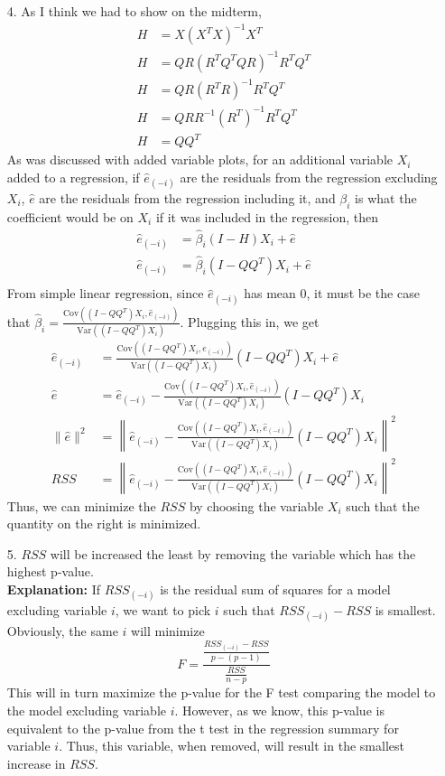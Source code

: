 \documentclass[11pt]{article}
\newcommand{\var}{\mathrm{Var}}
\newcommand{\cov}{\mathrm{Cov}}
\theoremstyle{definition}
\begin{document}
\begin{itemize}
    \item[4.]
        As I think we had to show on the midterm,
        \begin{align*}
            H&= X(X^TX)^{-1}X^T \\
            H&= QR(R^TQ^TQR)^{-1}R^TQ^T \\
            H&= QR(R^TR)^{-1}R^TQ^T \\
            H&= QRR^{-1}(R^T)^{-1}R^TQ^T \\
            H&= QQ^T
        \end{align*}
        As was discussed with added variable plots, for an additional variable $X_i$ added to a regression, if $\hat e_{(-i)}$ are the residuals from the regression excluding $X_i$, $\hat e$ are the residuals from the regression including it, and $\beta_i$ is what the coefficient would be on $X_i$ if it was included in the regression, then
        \begin{align*}
            \hat e_{(-i)} &= \hat\beta_i (I-H) X_i + \hat e \\ 
            \hat e_{(-i)} &= \hat\beta_i (I-QQ^T) X_i + \hat e \\ 
        \end{align*}
        From simple linear regression, since \(\hat e_{(-i)}\) has mean $0$, it must be the case that \(\hat\beta_i=\frac{\cov((I-QQ^T) X_i,\hat e_{(-i)})}{\var((I-QQ^T) X_i)}\). Plugging this in, we get
        \begin{align*}
            \hat e_{(-i)} &= \frac{\cov((I-QQ^T) X_i,e_{(-i)})}{\var((I-QQ^T) X_i)} (I-QQ^T) X_i + \hat e \\ 
            \hat e &= \hat e_{(-i)} - \frac{\cov\left((I-QQ^T) X_i,\hat e_{(-i)}\right)}{\var\left((I-QQ^T) X_i\right)} (I-QQ^T) X_i \\ 
            \|\hat e\|^2 &= \left\|\hat e_{(-i)} - \frac{\cov\left((I-QQ^T) X_i,\hat e_{(-i)}\right)}{\var\left((I-QQ^T) X_i\right)} (I-QQ^T) X_i \right \|^2 \\
            RSS &= \left\|\hat e_{(-i)} - \frac{\cov\left((I-QQ^T) X_i,\hat e_{(-i)}\right)}{\var\left((I-QQ^T) X_i\right)} (I-QQ^T) X_i \right \|^2
        \end{align*}
        Thus, we can minimize the $RSS$ by choosing the variable $X_i$ such that the quantity on the right is minimized.
    \item[5.]
        $RSS$ will be increased the least by removing the variable which has the highest p-value. \\
        \smallskip
        {\bf Explanation:} If $RSS_{(-i)}$ is the residual sum of squares for a model excluding variable $i$, we want to pick $i$ such that $RSS_{(-i)}-RSS$ is smallest. Obviously, the same $i$ will minimize
        \[ F= \frac{\frac{RSS_{(-i)}-RSS}{p-(p-1)}}{\frac{RSS}{n-p}}\]
        This will in turn maximize the p-value for the F test comparing the model to the model excluding variable $i$. However, as we know, this p-value is equivalent to the p-value from the t test in the regression summary for variable $i$. Thus, this variable, when removed, will result in the smallest increase in $RSS$.

\end{itemize}
\end{document}
